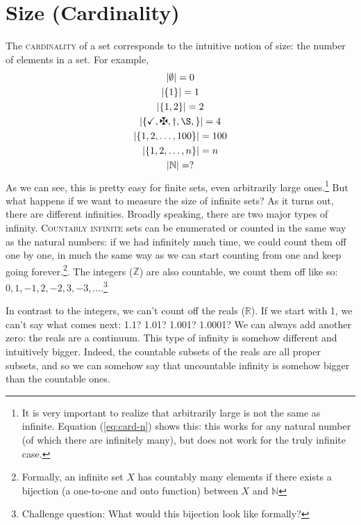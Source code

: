 \documentclass[a4paper,12pt,oneside,leqno]{scrartcl}%
\newcommand{\enquote}[1]{\frqq{}#1\flqq{}}
\theoremstyle{definition}
\newcommand{\terminus}[1]{\textsc{#1}}
\begin{document}
\section{Size (Cardinality)}
The \terminus{cardinality} of a set corresponds to the intuitive notion of \enquote{size}: the number of elements in a set.  For example,
\begin{gather}
\left| \emptyset \right| =  0 \\
\left| \left\{ 1 \right\} \right| = 1 \\
\left| \left\{ 1, 2 \right\} \right| =  2 \\
\left| \left\{ \checkmark{}, \maltese{}, \dag{}, \S,  \right\} \right| =  4 \\
\left| \left\{ 1, 2, \ldots, 100 \right\} \right| =  100 \\
\left| \left\{ 1, 2, \ldots, n \right\} \right| = n\label{eq:card-n}  \\
\left| \mathbb{N} \right| = ?    
\end{gather}
As we can see, this is pretty easy for finite sets, even arbitrarily large ones.\footnote{It is very important to realize that \enquote{arbitrarily large} is not the same as \enquote{infinite}.  Equation (\ref{eq:card-n}) shows this: this works for any natural number (of which there are infinitely many), but does not work for the truly infinite case.} But what happens if we want to measure the size of infinite sets?  As it turns out, there are different infinities.  Broadly speaking, there are two major types of infinity. \terminus{Countably infinite} sets can be enumerated or counted in the same way as the natural numbers: if we had infinitely much time, we could count them off one by one, in much the same way as we can start counting from one and keep going forever.\footnote{Formally, an infinite set $X$ has countably many elements if there exists a bijection (a one-to-one and onto function) between $X$ and $\mathbb{N}$}.  The integers ($\mathbb{Z}$) are also countable, we count them off like so: $0, 1, -1, 2, -2, 3, -3, \ldots$.\footnote{Challenge question: What would this bijection look like formally?}

In contrast to the integers, we can't count off the reals ($\mathbb{R}$). If we start with 1, we can't say what comes next: 1.1? 1.01? 1.001? 1.0001?  We can always add another zero: the reals are a continuum. This type of infinity is somehow different and intuitively \enquote{bigger}.  Indeed, the countable subsets of the reals are all proper subsets, and so we can somehow say that uncountable infinity is somehow \enquote{bigger} than the countable ones.
\end{document}
